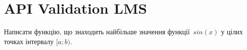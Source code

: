 \documentclass[12pt]{article}
\begin{document}
\section*{API Validation LMS}

Написати функцію, що знаходить найбільше значення функції~$sin(x)$ у цілих точках інтервалу $[a; b)$.


\end{document}
